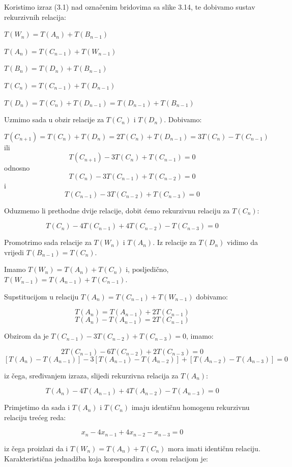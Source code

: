 \documentclass[times, utf8, zavrsni]{fer}
\begin{document}
\newpage

Koristimo izraz (3.1) nad označenim bridovima sa slike 3.14, te dobivamo sustav rekurzivnih relacija:

$T(W_n) = T(A_n) + T(B_{n - 1})$

$T(A_n) = T(C_{n - 1}) + T(W_{n - 1})$

$T(B_n) = T(D_n) + T(B_{n - 1})$

$T(C_n) = T(C_{n - 1}) + T(D_{n - 1})$

$T(D_n) = T(C_n) + T(D_{n - 1}) = T(D_{n - 1}) + T(B_{n - 1})$

Uzmimo sada u obzir relacije za $T(C_n)$ i $T(D_n)$. Dobivamo:

\[T(C_{n + 1}) = T(C_n) + T(D_n) = 2T(C_n) + T(D_{n - 1}) = 3T(C_n) - T(C_{n - 1})\]
ili 
\[T(C_{n + 1}) - 3T(C_n) + T(C_{n - 1}) = 0\]
odnosno
\[T(C_n) - 3T(C_{n - 1}) + T(C_{n - 2}) = 0\] i
\[T(C_{n-1}) - 3T(C_{n - 2}) + T(C_{n - 3}) = 0\]

Oduzmemo li prethodne dvije relacije, dobit ćemo rekurzivnu relaciju za $T(C_n)$:

\[T(C_n) - 4T(C_{n - 1}) + 4T(C_{n - 2}) - T(C_{n - 3}) = 0\]

Promotrimo sada relacije za $T(W_n)$ i $T(A_n)$. Iz relacije za $T(D_n)$ vidimo da vrijedi $T(B_{n -1}) = T(C_n)$. 

Imamo $T(W_n) = T(A_n) + T(C_n)$ i, posljedično, $T(W_{n - 1}) = T(A_{n - 1}) + T(C_{n - 1})$.

Supstitucijom u relaciju $T(A_n) = T(C_{n - 1}) + T(W_{n - 1})$ dobivamo:

\[T(A_n) = T(A_{n - 1}) + 2T(C_{n - 1})\]
\[T(A_n) - T(A_{n - 1}) = 2T(C_{n - 1})\]

Obzirom da je $T(C_{n - 1}) - 3T(C_{n - 2}) + T(C_{n - 3}) = 0$, imamo:

\[2T(C_{n - 1}) - 6T(C_{n - 2}) + 2T(C_{n - 3}) = 0\]
\[[T(A_n) - T(A_{n - 1})] - 3[T(A_{n - 1}) - T(A_{n - 2})] + [T(A_{n - 2}) - T(A_{n - 3})] = 0\]

iz čega, sređivanjem izraza, slijedi rekurzivna relacija za $T(A_n)$:

\[T(A_n) - 4T(A_{n - 1}) + 4T(A_{n - 2}) - T(A_{n - 3}) = 0\]

Primjetimo da sada i $T(A_n)$ i $T(C_n)$ imaju identičnu homogenu rekurzivnu relaciju trećeg reda:

\[x_n - 4x_{n - 1} + 4x_{n - 2} - x_{n - 3} = 0\]

iz čega proizlazi da i $T(W_n) = T(A_n) + T(C_n)$ mora imati identičnu relaciju. Karakteristična jednadžba koja korespondira s ovom relacijom je:
\end{document}
